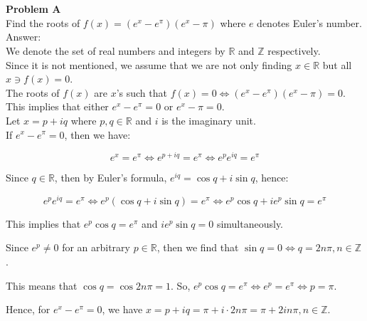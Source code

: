 \documentclass[12pt, letterpaper]{report}
\begin{document}
\setlength{\abovedisplayskip}{0pt}
\setlength{\belowdisplayskip}{0pt}
\setlength{\abovedisplayshortskip}{0pt}
\setlength{\belowdisplayshortskip}{0pt}

\makebox[\linewidth]{\rule{\textwidth}{0.4pt}}\\
\\\textbf{Problem A}\\
Find the roots of $f(x) = (e^x - e^\pi)(e^x - \pi)$ where $e$ denotes Euler's number.\\

Answer:\\
We denote the set of real numbers and integers by $\mathbb{R}$ and $\mathbb{Z}$ respectively.\\
Since it is not mentioned, we assume that we are not only finding $x\in\mathbb{R}$ but all $x\ni f(x) = 0$.\\

The roots of $f(x)$ are $x$'s such that $f(x) = 0 \Leftrightarrow (e^x - e^\pi)(e^x - \pi) = 0$.\\
This implies that either $e^x - e^\pi = 0$ or $e^x - \pi = 0$.\\

Let $x = p + iq$ where $p,q\in\mathbb{R}$ and $i$ is the imaginary unit.\\

If $e^x - e^\pi = 0$, then we have:

\begin{equation*}
e^x = e^\pi \Leftrightarrow e^{p+iq} = e^\pi \Leftrightarrow e^p e^{iq} = e^\pi
\end{equation*}

Since $q\in\mathbb{R}$, then by Euler's formula, $e^{iq} = \cos{q} + i\sin{q}$, hence:

\begin{equation*}
e^p e^{iq} = e^\pi \Leftrightarrow e^p(\cos{q} + i\sin{q}) = e^\pi \Leftrightarrow e^p \cos{q} + ie^p \sin{q} = e^\pi
\end{equation*}

This implies that $e^p \cos{q} = e^\pi$ and $ie^p \sin{q} = 0$ simultaneously.

Since $e^p\neq 0$ for an arbitrary $p\in\mathbb{R}$, then we find that $\sin{q}=0\Leftrightarrow q = 2n\pi, n\in\mathbb{Z}$.

This means that $\cos{q} = \cos{2n\pi} = 1$. So, $e^p\cos{q} = e^\pi\Leftrightarrow e^{p} = e^\pi\Leftrightarrow p = \pi$.

Hence, for $e^x - e^\pi = 0$, we have $x = p + iq = \pi + i\cdot 2n\pi = \pi + 2in\pi, n\in\mathbb{Z}$.\\
\end{document}
